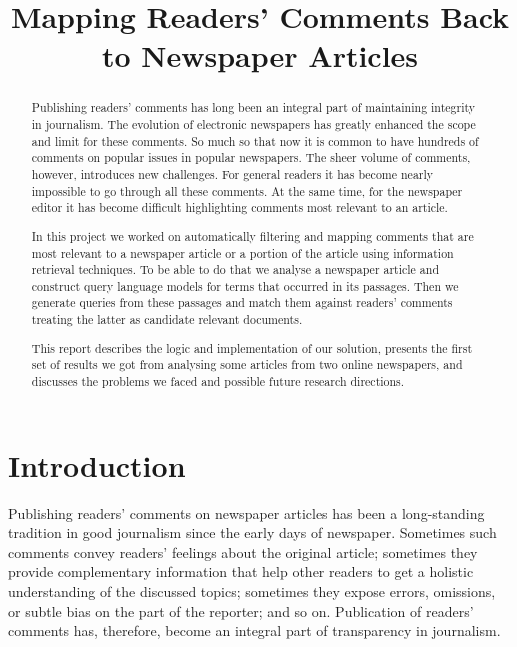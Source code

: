 \documentclass[article]{IEEEtran}
\begin{document}
\title{Mapping Readers' Comments Back to Newspaper Articles}
\author{
        }
\maketitle


\maketitle
\begin{abstract}
Publishing readers' comments has long been an integral part of maintaining integrity in journalism. The evolution of electronic newspapers has greatly enhanced the scope and limit for these comments. So much so that now it is common to have hundreds of comments on popular issues in popular newspapers. The sheer volume of comments, however, introduces new challenges. For general readers it has become nearly impossible to go through all these comments. At the same time, for the newspaper editor it has become difficult highlighting comments most relevant to an article. 

In this project we worked on automatically filtering and mapping comments that are most relevant to a newspaper article or a portion of the article using information retrieval techniques. To be able to do that we analyse a newspaper article and construct query language models for terms that occurred in its passages. Then we generate queries from these passages and match them against readers' comments treating the latter as candidate relevant documents.

This report describes the logic and implementation of our solution, presents the first set of results we got from analysing some articles from two online newspapers, and discusses the problems we faced and possible future research directions.   
\end{abstract}


\section{Introduction}
Publishing readers' comments on newspaper articles has been a long-standing tradition in good journalism since the early days of newspaper. Sometimes such  comments convey readers' feelings about the original article; sometimes they provide complementary information that help other readers to get a holistic understanding of the discussed topics; sometimes they expose errors, omissions, or subtle bias on the part of the reporter; and so on. Publication of readers' comments has, therefore, become an integral part of transparency in journalism.
\end{document}
